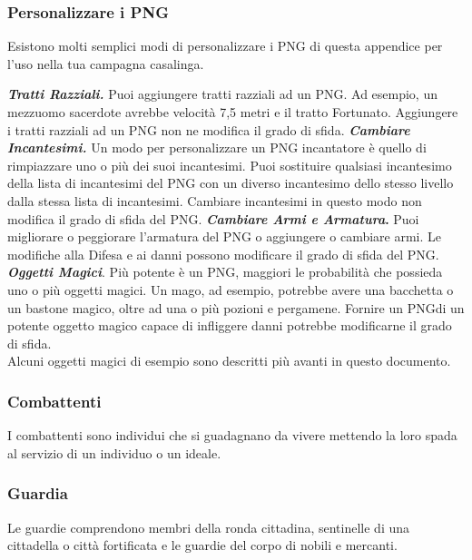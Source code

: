 \begin{multicols}{2}
\subsubsection{Personalizzare i PNG}

Esistono molti semplici modi di personalizzare i PNG di questa appendice per l'uso nella tua campagna casalinga.

\emph{\textbf{Tratti Razziali.}} Puoi aggiungere tratti razziali ad un PNG. Ad esempio, un mezzuomo sacerdote avrebbe velocità 7,5 metri e il tratto Fortunato. Aggiungere i tratti razziali ad un PNG non ne modifica il grado di sfida. \emph{\textbf{Cambiare Incantesimi.}} Un modo per personalizzare un PNG incantatore è quello di rimpiazzare uno o più dei suoi incantesimi. Puoi sostituire qualsiasi incantesimo della lista di incantesimi del PNG con un diverso incantesimo dello stesso livello dalla stessa lista di incantesimi. Cambiare incantesimi in questo modo non modifica il grado di sfida del PNG. \textbf{\emph{Cambiare Armi e Armatura}.} Puoi migliorare o peggiorare l'armatura del PNG o aggiungere o cambiare armi. Le modifiche alla Difesa e ai danni possono modificare il grado di sfida del PNG. \emph{\textbf{Oggetti Magici}}. Più potente è un PNG, maggiori le probabilità che possieda uno o più oggetti magici. Un mago, ad esempio, potrebbe avere una bacchetta o un bastone magico, oltre ad una o più pozioni e pergamene. Fornire un PNGdi un potente oggetto  magico capace di infliggere danni potrebbe modificarne il grado di sfida.\\

Alcuni oggetti magici di esempio sono descritti più avanti in questo documento.\\

\subsubsection{Combattenti}

I combattenti sono individui che si guadagnano da vivere mettendo la loro spada al servizio di un individuo o un ideale.

\subsubsection{Guardia}

Le guardie comprendono membri della ronda cittadina, sentinelle di una cittadella o città fortificata e le guardie del corpo di nobili e mercanti.\\


\end{multicols}

